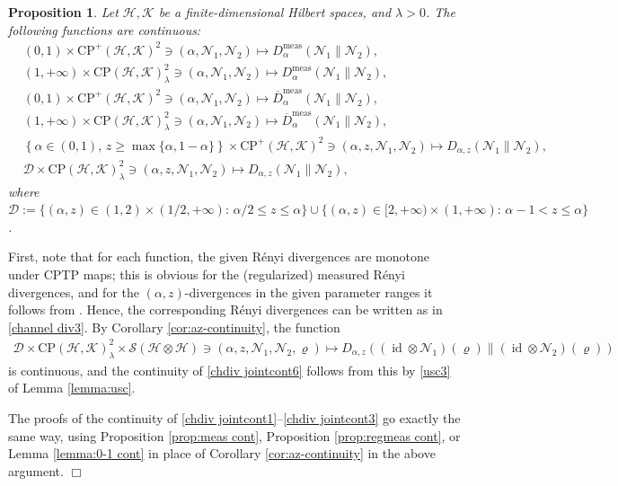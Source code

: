 \documentclass[unsortedaddress,superscriptaddress,pra,notitlepage]{revtex4}
\newtheorem{prop}[definition]{Proposition}
\newenvironment{proof}[1][Proof]{\begin{trivlist}
\item[\hskip \labelsep {\bfseries #1}]}{\hfill$\Box$\end{trivlist}}
\def\D{{\mathcal D}}
\def\N{\mathcal{N}}
\def\S{{\mathcal S}}
\def\rho{\varrho}
\def\hil{{\mathcal H}}
\def\kil{{\mathcal K}}
\def\oll{\overline}
\def\CP{\mathrm{CP}}
\def\meas{\mathrm{meas}}
\def\cpso{\text{CPSO} }
\DeclareMathOperator{\id}{id}
\begin{document}
\begin{prop}\label{prop:channel joint cont}
Let $\hil,\kil$ be a finite-dimensional Hilbert spaces, and $\lambda>0$. The 
following functions are continuous:
\begin{align}
&(0,1)\times\CP^+(\hil,\kil)^2\ni(\alpha,\N_1,\N_2)\mapsto D_{\alpha}^{\meas}(\N_1\|\N_2),
\label{chdiv jointcont1}\\
&(1,+\infty)\times\CP(\hil,\kil)_{\lambda}^2\ni(\alpha,\N_1,\N_2)\mapsto D_{\alpha}^{\meas}(\N_1\|\N_2),
\label{chdiv jointcont4}\\
&(0,1)\times\CP^+(\hil,\kil)^2\ni(\alpha,\N_1,\N_2)\mapsto\oll{D}_{\alpha}^{\meas}(\N_1\|\N_2),
\label{chdiv jointcont2}\\
&(1,+\infty)\times\CP(\hil,\kil)_{\lambda}^2\ni(\alpha,\N_1,\N_2)\mapsto \oll{D}_{\alpha}^{\meas}(\N_1\|\N_2),
\label{chdiv jointcont5}\\
&\left\{\alpha\in(0,1),\,z\ge\max\{\alpha,1-\alpha\}\right\}\times\CP^+(\hil,\kil)^2
\ni(\alpha,z,\N_1,\N_2)\mapsto D_{\alpha,z}(\N_1\|\N_2),\label{chdiv jointcont3}\\
&\D\times\CP(\hil,\kil)_{\lambda}^2\ni(\alpha,z,\N_1,\N_2)\mapsto D_{\alpha,z}(\N_1\|\N_2),
\label{chdiv jointcont6}
\end{align}
where $\D:=\{(\alpha,z)\in(1,2)\times(1/2,+\infty):\,\alpha/2\le z\le\alpha\}
\cup\{(\alpha,z)\in[2,+\infty)\times(1,+\infty):\,\alpha-1<z\le\alpha\}$.
\end{prop}
\begin{proof}
First, note that for each function, the given R\'enyi divergences are monotone under CPTP maps; this is obvious for the (regularized) measured R\'enyi divergences, and for the
$(\alpha,z)$-divergences in the given parameter ranges it follows from 
\cite{Zhang2018}.
Hence, the corresponding \cpso R\'enyi divergences can be written as in 
\eqref{channel div3}.
By Corollary \ref{cor:az-continuity}, 
the function 
\begin{align*}
\D\times\CP(\hil,\kil)_{\lambda}^2\times \S(\hil\otimes\hil)\ni(\alpha,z,\N_1,\N_2,\rho)\mapsto 
D_{\alpha,z}((\id\otimes\N_1)(\rho)\|(\id\otimes\N_2)(\rho))
\end{align*}
is continuous, and the continuity of \eqref{chdiv jointcont6}
follows from this by \ref{usc3} of Lemma \ref{lemma:usc}. 

The proofs of the continuity of \eqref{chdiv jointcont1}--\eqref{chdiv jointcont3} go exactly the same way, 
using Proposition \ref{prop:meas cont}, Proposition \ref{prop:regmeas cont}, or 
Lemma \ref{lemma:0-1 cont} in place of Corollary \ref{cor:az-continuity} in the above argument.
\end{proof}
\end{document}
